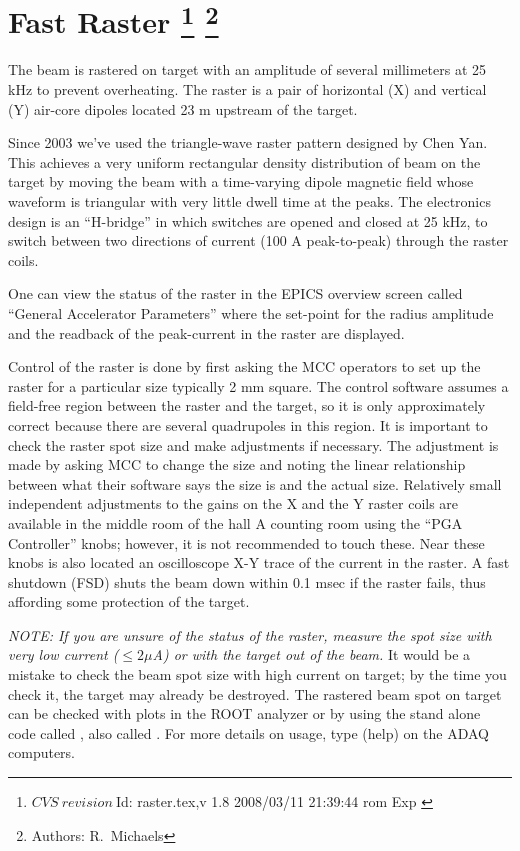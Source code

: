 \section[Fast Raster]{Fast Raster
\footnote{
  $CVS~revision~ $Id: raster.tex,v 1.8 2008/03/11 21:39:44 rom Exp $ $
}
\footnote{Authors: R.~Michaels }
}

The beam is rastered on target with an amplitude of
several millimeters at 25 kHz to prevent overheating.  
The raster is a pair of horizontal (X) and vertical (Y)
air-core dipoles located 23 m upstream of the
target.

Since 2003 we've used the triangle-wave 
raster pattern designed by Chen Yan.  
This achieves a very uniform rectangular
density distribution of beam on the target 
by moving the beam with a time-varying dipole
magnetic field whose waveform is triangular
with very little dwell time at the peaks.  
The electronics design is an ``H-bridge''
in which switches are opened and closed 
at 25 kHz, to switch between two directions 
of current (100 A peak-to-peak) 
through the raster coils.

One can view the 
status of the raster in the
EPICS overview screen called ``General Accelerator
Parameters'' where the set-point for the radius amplitude
and the readback of the peak-current in the raster are displayed.

Control of the raster is done by first asking the MCC
operators to set up the raster for a particular size
typically 2 mm square.
The control software assumes a field-free region between
the raster and the target, so it is only approximately
correct because there are several quadrupoles in this region.
It is important to check the raster spot size and
make adjustments if necessary.  The adjustment is made
by asking MCC to change the size and noting the 
linear relationship between what their software says
the size is and the actual size.
Relatively small independent adjustments to the 
gains on the X and the Y raster
coils are available in the middle room of the hall A
counting room using the ``PGA Controller'' knobs;
however, it is not recommended to touch these.
Near these knobs is also located an oscilloscope X-Y trace
of the current in the raster.  A fast shutdown (FSD) shuts
the beam down within 0.1 msec if the raster fails, thus
affording some protection of the target.

{\it NOTE:  If you are unsure of the status of the raster,
measure the spot size with very low current ($\le 2 \mu$A) or with
the target out of the beam.}  It would be a mistake
to check the beam spot size with high current on target; by
the time you check it, the target may already be destroyed.
The rastered beam spot on target can be checked with
plots in the ROOT analyzer or by 
using the stand alone code called ,
also called .
For more details on usage, type  (help)
on the ADAQ computers.

